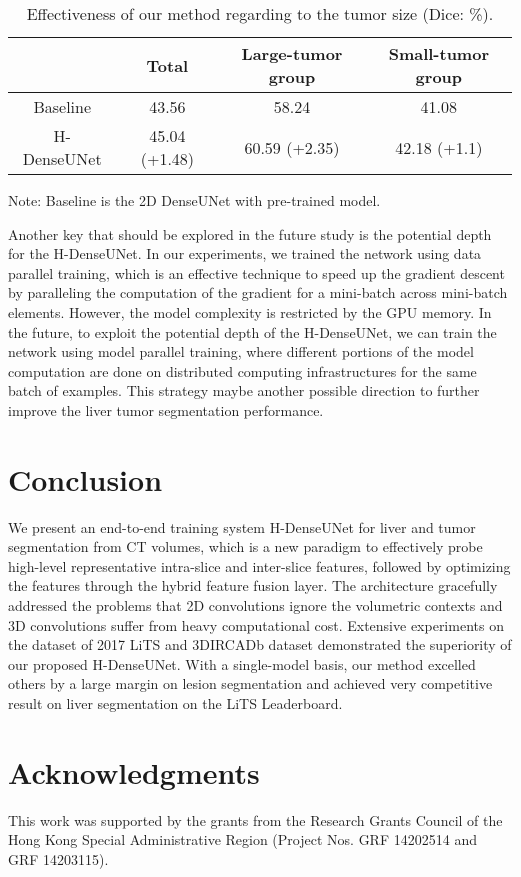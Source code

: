\documentclass[journal]{IEEEtran}
\begin{document}
\begin{table}[!t]
	\centering
	\caption{Effectiveness of our method regarding to the tumor size (Dice: \%).}
	\label{tab: tumor size performance} {	
		\begin{tabular}{c|c|c|c}
			\hline
			& Total & Large-tumor group & Small-tumor group    \tabularnewline
			\hline
			Baseline & 43.56 &  58.24  & 41.08       \tabularnewline
			\hline
			H-DenseUNet  &  45.04 (+1.48) & 60.59 (+2.35)  &  42.18  (+1.1) \tabularnewline
			\hline
		\end{tabular}
		{	
			\begin{tablenotes}
				\centering
				\small
				\item Note: Baseline is the 2D DenseUNet with pre-trained model.
			\end{tablenotes}
		}
	}
\end{table}


Another key that should be explored in the future study is the potential depth for the H-DenseUNet. In our experiments, we trained the network using data parallel training, which is an effective technique to speed up the gradient descent by paralleling the computation of the gradient for a mini-batch across mini-batch elements. However, the model complexity is restricted by the GPU memory. 
In the future, to exploit the potential depth of the H-DenseUNet, we can train the network using model parallel training, where different portions of the model computation are done on distributed computing infrastructures for the same batch of examples.
This strategy maybe another possible direction to further improve the liver tumor segmentation performance.





\section{Conclusion}
We present an end-to-end training system H-DenseUNet for liver and tumor segmentation from CT volumes, which is a new paradigm to effectively probe high-level representative intra-slice and inter-slice features, followed by optimizing the features through the hybrid feature fusion layer. 
The architecture gracefully addressed the problems that 2D convolutions ignore the volumetric contexts and 3D convolutions suffer from heavy computational cost. 
Extensive experiments on the dataset of 2017 LiTS and 3DIRCADb dataset demonstrated the superiority of our proposed H-DenseUNet. 
With a single-model basis, our method excelled others by a large margin on lesion segmentation and achieved very competitive result on liver segmentation on the LiTS Leaderboard.




\section{Acknowledgments}
This work was supported by the grants from the Research Grants Council of the Hong Kong Special Administrative Region (Project Nos.  GRF 14202514 and GRF 14203115). 




\ifCLASSOPTIONcaptionsoff
  \newpage
\fi
\end{document}
